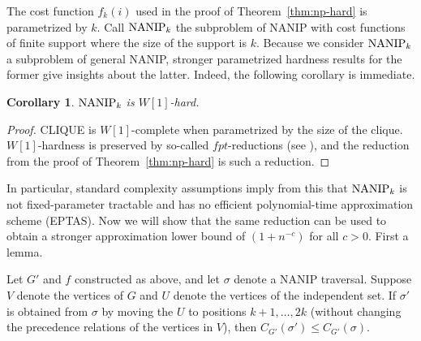 \documentclass[english]{llncs}
\newtheorem{cor}[thm]{Corollary}
\begin{document}
The cost function $f_k(i)$ used in the proof of Theorem~\ref{thm:np-hard} is
parametrized by $k$.  Call $\textup{NANIP}_k$ the subproblem of NANIP with cost
functions of finite support where the size of the support is $k$. Because we
consider $\textup{NANIP}_k$ a subproblem of general NANIP, stronger
parametrized hardness results for the former give insights about the latter.
Indeed, the following corollary is immediate.

\begin{cor}
$\textup{NANIP}_k$ is $W[1]$-hard.
\end{cor}

\begin{proof} 

CLIQUE is $W[1]$-complete when parametrized by the size of the clique.
$W[1]$-hardness is preserved by so-called $fpt$-reductions (see
\cite{DowneyF13}), and the reduction from the proof of
Theorem~\ref{thm:np-hard} is such a reduction. 

\end{proof}

In particular, standard complexity assumptions imply from this that
$\textup{NANIP}_k$ is not fixed-parameter tractable and has no efficient
polynomial-time approximation scheme (EPTAS). Now we will show that the same
reduction can be used to obtain a stronger approximation lower bound of $(1 +
n^{-c})$ for all $c > 0$. First a lemma.

\begin{lemma}
Let $G'$ and $f$ constructed as above, and let $\sigma$ denote a NANIP
traversal.  Suppose $V$ denote the vertices of $G$ and $U$ denote the vertices
of the independent set.  If $\sigma'$ is obtained from $\sigma$ by moving the
$U$ to positions $k+1,\ldots,2k$ (without changing the precedence relations of the vertices
in $V$), then $C_{G'}(\sigma')\le C_{G'}(\sigma)$.
\end{lemma}
\end{document}
